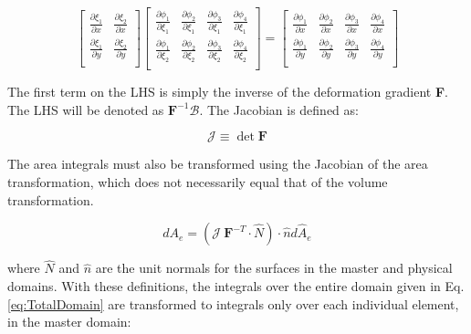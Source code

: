 \documentclass[10pt]{article}
\begin{document}
\begin{equation}
\begin{bmatrix}\frac{\partial\xi_1}{\partial x} & \frac{\partial\xi_2}{\partial x}\\
\frac{\partial\xi_1}{\partial y} & \frac{\partial\xi_2}{\partial y}\\
\end{bmatrix}
\begin{bmatrix}
\frac{\partial\phi_1}{\partial \xi_1} & \frac{\partial\phi_2}{\partial \xi_1} & \frac{\partial\phi_3}{\partial \xi_1} & \frac{\partial\phi_4}{\partial \xi_1}\\
\frac{\partial\phi_1}{\partial \xi_2} & \frac{\partial\phi_2}{\partial \xi_2} & \frac{\partial\phi_3}{\partial \xi_2} & \frac{\partial\phi_4}{\partial \xi_2}\\
\end{bmatrix}=
\begin{bmatrix}\frac{\partial \phi_1}{\partial x} & \frac{\partial \phi_2}{\partial x} & \frac{\partial \phi_3}{\partial x} & \frac{\partial \phi_4}{\partial x}\\
\frac{\partial \phi_1}{\partial y} & \frac{\partial \phi_2}{\partial y} & \frac{\partial \phi_3}{\partial y} & \frac{\partial \phi_4}{\partial y}\\
\end{bmatrix}
\end{equation}

The first term on the LHS is simply the inverse of the deformation gradient \textbf{F}. The LHS will be denoted as \(\textbf{F}^{-1}\mathscr{B}\). The Jacobian is defined as:

\begin{equation}
\mathscr{J}\equiv\det{\textbf{F}}
\end{equation}

The area integrals must also be transformed using the Jacobian of the area transformation, which does not necessarily equal that of the volume transformation. 

\begin{equation}
\label{eq:Nanson}
dA_e=(\mathscr{J}\ \textbf{F}^{-T}\cdot\hat{N})\cdot\hat{n}d\hat{A}_e
\end{equation}

where \(\hat{N}\) and \(\hat{n}\) are the unit normals for the surfaces in the master and physical domains. With these definitions, the integrals over the entire domain given in Eq. \eqref{eq:TotalDomain} are transformed to integrals only over each individual element, in the master domain:
\end{document}
